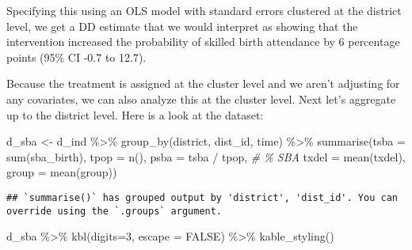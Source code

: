 \documentclass[
]{article}
\newenvironment{Shaded}{\begin{snugshade}}{\end{snugshade}}
\newcommand{\AttributeTok}[1]{\textcolor[rgb]{0.77,0.63,0.00}{#1}}
\newcommand{\CommentTok}[1]{\textcolor[rgb]{0.56,0.35,0.01}{\textit{#1}}}
\newcommand{\ConstantTok}[1]{\textcolor[rgb]{0.00,0.00,0.00}{#1}}
\newcommand{\DecValTok}[1]{\textcolor[rgb]{0.00,0.00,0.81}{#1}}
\newcommand{\FunctionTok}[1]{\textcolor[rgb]{0.00,0.00,0.00}{#1}}
\newcommand{\NormalTok}[1]{#1}
\newcommand{\OtherTok}[1]{\textcolor[rgb]{0.56,0.35,0.01}{#1}}
\newcommand{\SpecialCharTok}[1]{\textcolor[rgb]{0.00,0.00,0.00}{#1}}
\begin{document}
Specifying this using an OLS model with standard errors clustered at the
district level, we get a DD estimate that we would interpret as showing
that the intervention increased the probability of skilled birth
attendance by 6 percentage points (95\% CI -0.7 to 12.7).

Because the treatment is assigned at the cluster level and we aren't
adjusting for any covariates, we can also analyze this at the cluster
level. Next let's aggregate up to the district level. Here is a look at
the dataset:

\begin{Shaded}
\begin{Highlighting}[]
\NormalTok{d\_sba }\OtherTok{\textless{}{-}}\NormalTok{ d\_ind }\SpecialCharTok{\%\textgreater{}\%}
  \FunctionTok{group\_by}\NormalTok{(district, dist\_id, time) }\SpecialCharTok{\%\textgreater{}\%}
  \FunctionTok{summarise}\NormalTok{(}\AttributeTok{tsba =} \FunctionTok{sum}\NormalTok{(sba\_birth),}
         \AttributeTok{tpop =} \FunctionTok{n}\NormalTok{(),}
         \AttributeTok{psba =}\NormalTok{ tsba }\SpecialCharTok{/}\NormalTok{ tpop, }\CommentTok{\# \% SBA}
         \AttributeTok{txdel =} \FunctionTok{mean}\NormalTok{(txdel),}
         \AttributeTok{group =} \FunctionTok{mean}\NormalTok{(group))}
\end{Highlighting}
\end{Shaded}

\begin{verbatim}
## `summarise()` has grouped output by 'district', 'dist_id'. You can override using the `.groups` argument.
\end{verbatim}

\begin{Shaded}
\begin{Highlighting}[]
\NormalTok{d\_sba }\SpecialCharTok{\%\textgreater{}\%}
  \FunctionTok{kbl}\NormalTok{(}\AttributeTok{digits=}\DecValTok{3}\NormalTok{, }\AttributeTok{escape =} \ConstantTok{FALSE}\NormalTok{) }\SpecialCharTok{\%\textgreater{}\%}
  \FunctionTok{kable\_styling}\NormalTok{()}
\end{Highlighting}
\end{Shaded}
\end{document}
